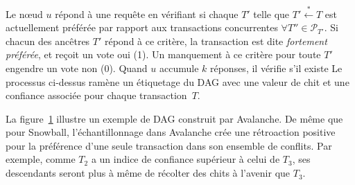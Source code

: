Le nœud $u$ répond à une requête en vérifiant si chaque $T'$ telle que $T' \stackrel{*}{\gets} T$ est actuellement préférée par rapport aux transactions concurrentes $\forall T'' \in \mathcal{P}_{T'}$.
Si chacun des ancêtres $T'$ répond à ce critère, la transaction est dite \emph{fortement préférée}, et reçoit un vote oui (1). Un manquement à ce critère pour toute $T'$ engendre un vote non (0).
Quand $u$ accumule $k$ réponses, il vérifie s'il existe
Le processus ci-dessus ramène un étiquetage du DAG avec une valeur de chit et une confiance associée pour chaque transaction~$T$.

\begin{figure}
\begin{center}
    
    \label{fig:dag-cd}
\end{center}
\end{figure}

La figure~\ref{fig:dag-cd} illustre un exemple de DAG construit par Avalanche.
De même que pour Snowball, l'échantillonnage dans Avalanche crée une rétroaction positive pour la préférence d'une seule transaction dans son ensemble de conflits.
Par exemple, comme $T_2$ a un indice de confiance supérieur à celui de $T_3$, ses descendants seront plus à même de récolter des chits à l'avenir que $T_3$.

